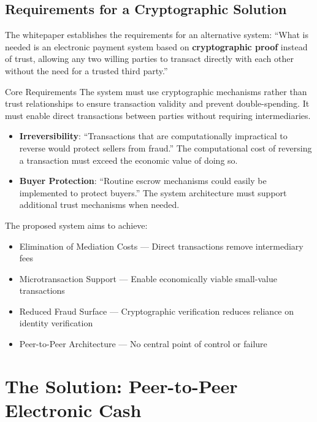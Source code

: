 \subsection{Requirements for a Cryptographic Solution}
\label{subsec:crypto-requirements}

The whitepaper establishes the requirements for an alternative system: ``What is needed is an electronic payment system based on \textbf{cryptographic proof} instead of trust, allowing any two willing parties to transact directly with each other without the need for a trusted third party.''

\begin{infobox}{Core Requirements}
The system must use cryptographic mechanisms rather than trust relationships to ensure transaction validity and prevent double-spending. It must enable direct transactions between parties without requiring intermediaries.

\begin{itemize}
  \item \textbf{Irreversibility}: ``Transactions that are computationally impractical to reverse would protect sellers from fraud.'' The computational cost of reversing a transaction must exceed the economic value of doing so.
  \item \textbf{Buyer Protection}: ``Routine escrow mechanisms could easily be implemented to protect buyers.'' The system architecture must support additional trust mechanisms when needed.
\end{itemize}
\end{infobox}

The proposed system aims to achieve:
\begin{itemize}
  \item Elimination of Mediation Costs --- Direct transactions remove intermediary fees
  \item Microtransaction Support --- Enable economically viable small-value transactions
  \item Reduced Fraud Surface --- Cryptographic verification reduces reliance on identity verification
  \item Peer-to-Peer Architecture --- No central point of control or failure
\end{itemize}


\section{The Solution: Peer-to-Peer Electronic Cash}
\label{sec:solution-p2p}

